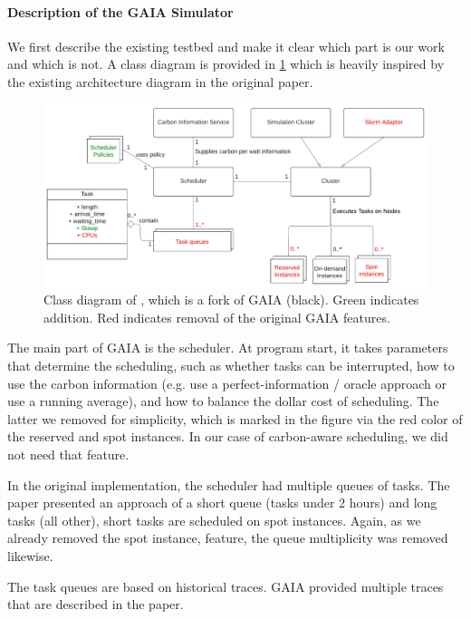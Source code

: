 \paragraph{Description of the GAIA Simulator}

We first describe the existing testbed and make it clear which part is our work and which is not. A class diagram is provided in \ref{fig:class_diagram} which is heavily inspired by the existing architecture diagram in the original paper. 

\begin{figure}
    \includegraphics[width=\linewidth]{images/MA Thesis Diagram.pdf}
    \caption{Class diagram of \programname{}, which is a fork of GAIA (black). Green indicates addition. Red indicates removal of the original GAIA features.}
    \label{fig:class_diagram}
\end{figure}

The main part of GAIA is the scheduler. At program start, it takes parameters that determine the scheduling, such as whether tasks can be interrupted, how to use the carbon information (e.g. use a perfect-information / oracle approach or use a running average), and how to balance the dollar cost of scheduling. 
The latter we removed for simplicity, which is marked in the figure via the red color of the reserved and spot instances. In our case of carbon-aware scheduling, we did not need that feature.

In the original implementation, the scheduler had multiple queues of tasks. 
The paper presented an approach of a short queue (tasks under 2 hours) and long tasks (all other), short tasks are scheduled on spot instances. 
Again, as we already removed the spot instance, feature, the queue multiplicity was removed likewise.

The task queues are based on historical traces. GAIA provided multiple traces that are described in the paper.

